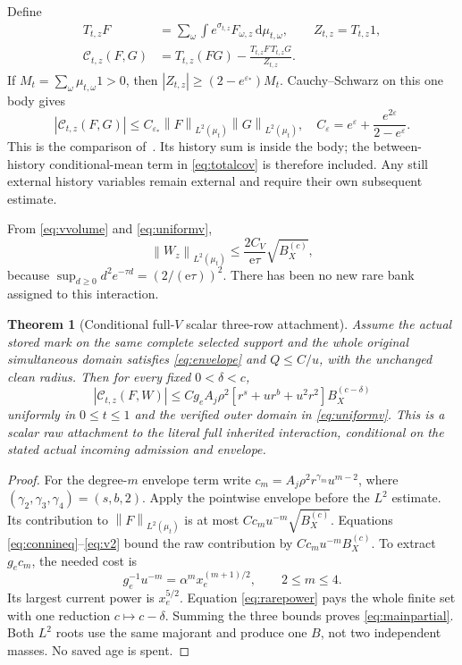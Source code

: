 \documentclass[11pt,letterpaper]{article}
\numberwithin{equation}{section}
\theoremstyle{plain}
\newtheorem{theorem}{Theorem}[section]
\theoremstyle{remark}\newtheorem{remark}[theorem]{Scope}
\newcommand{\dd}{\,\mathrm d}\newcommand{\eps}{\varepsilon}
\newcommand{\norm}[1]{\left\lVert#1\right\rVert}
\begin{document}
Define
\begin{align}
 T_{t,z}F&=\sum_\omega\int e^{\sigma_{t,z}}F_{\omega,z}\dd\mu_{t,\omega},
 \qquad Z_{t,z}=T_{t,z}1,\nonumber\\
 \mathcal C_{t,z}(F,G)&=T_{t,z}(FG)
       -\frac{T_{t,z}F\,T_{t,z}G}{Z_{t,z}}.
 \label{eq:rawconn}
\end{align}
If $M_t=\sum_\omega\mu_{t,\omega}1>0$, then
$|Z_{t,z}|\ge(2-e^{\eps_*})M_t$. Cauchy--Schwarz on this one body gives
\begin{equation}
 |\mathcal C_{t,z}(F,G)|
 \le C_{\eps_*}\norm F_{L^2(\mu_t)}\norm G_{L^2(\mu_t)},
 \quad C_{\eps}=e^{\eps}+\frac{e^{2\eps}}{2-e^{\eps}}.
 \label{eq:connineq}
\end{equation}
This is the comparison of~\cite[\S3]{CE}. Its history sum is inside
the body; the between-history conditional-mean term in
\eqref{eq:totalcov} is therefore included. Any still external history
variables remain external and require their own subsequent estimate.

From \eqref{eq:vvolume} and \eqref{eq:uniformv},
\begin{equation}
 \norm{W_z}_{L^2(\mu_t)}
 \le \frac{2C_V}{\mathrm e\tau}\sqrt{B_X^{(c)}},
 \label{eq:v2}
\end{equation}
because $\sup_{d\ge0}d^2e^{-\tau d}=(2/(\mathrm e\tau))^2$.
There has been no new rare bank assigned to this interaction.

\begin{theorem}[Conditional full-$V$ scalar three-row attachment]
Assume the actual stored mark on the same complete selected support and
the whole original simultaneous domain satisfies
\eqref{eq:envelope} and $Q\le C/u$, with the unchanged clean radius.
Then for every fixed $0<\delta<c$,
\begin{equation}
 \boxed{
 |\mathcal C_{t,z}(F,W)|
 \le Cg_e A_j\rho^2
 \left[r^s+ur^b+u^2r^2\right] B_X^{(c-\delta)}
 }
 \label{eq:mainpartial}
\end{equation}
uniformly in $0\le t\le1$ and the verified outer domain in
\eqref{eq:uniformv}. This is a scalar raw attachment to the
literal full inherited interaction, conditional on the stated actual
incoming admission and envelope.
\end{theorem}
\begin{proof}
For the degree-$m$ envelope term write
$c_m=A_j\rho^2r^{\gamma_m}u^{m-2}$, where
$(\gamma_2,\gamma_3,\gamma_4)=(s,b,2)$.
Apply the pointwise envelope before the $L^2$ estimate. Its contribution
to $\norm F_{L^2(\mu_t)}$ is at most $Cc_mu^{-m}\sqrt{B_X^{(c)}}$.
Equations \eqref{eq:connineq}--\eqref{eq:v2} bound the raw contribution
by $Cc_mu^{-m}B_X^{(c)}$. To extract $g_ec_m$, the needed cost is
\begin{equation}
 g_e^{-1}u^{-m}=\alpha^m x_e^{(m+1)/2},\qquad 2\le m\le4.
 \label{eq:sharpcost}
\end{equation}
Its largest current power is $x_e^{5/2}$. Equation
\eqref{eq:rarepower} pays the whole finite set with one reduction
$c\mapsto c-\delta$. Summing the three bounds proves
\eqref{eq:mainpartial}. Both $L^2$ roots use the same majorant and
produce one $B$, not two independent masses. No saved age is spent.
\end{proof}
\end{document}
